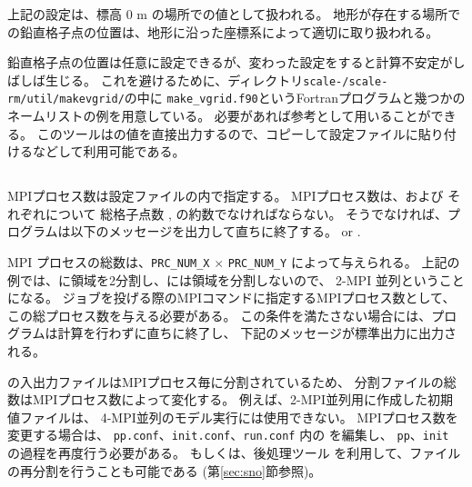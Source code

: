 上記の設定は、標高 0 m の場所での値として扱われる。
地形が存在する場所での鉛直格子点の位置は、地形に沿った座標系によって適切に取り扱われる。


鉛直格子点の位置は任意に設定できるが、変わった設定をすると計算不安定がしばしば生じる。
これを避けるために、ディレクトリ\texttt{scale-\version/scale-rm/util/makevgrid/}の中に
\verb|make_vgrid.f90|というFortranプログラムと幾つかのネームリストの例を用意している。
必要があれば参考として用いることができる。
このツールはの値を直接出力するので、コピーして設定ファイルに貼り付けるなどして利用可能である。

\subsection{\SubsecMPIProcess} \label{subsec:relation_dom_reso2}

MPIプロセス数は設定ファイルの内で指定する。
MPIプロセス数は、\XDIR および \YDIR それぞれについて
総格子点数 ,  の約数でなければならない。
そうでなければ、プログラムは以下のメッセージを出力して直ちに終了する。
or
.

MPI プロセスの総数は、\verb|PRC_NUM_X| $\times$ \verb|PRC_NUM_Y|  によって与えられる。
上記の例では、\XDIR に領域を2分割し、\YDIR には領域を分割しないので、
2-MPI 並列ということになる。
ジョブを投げる際のMPIコマンドに指定するMPIプロセス数として、この総プロセス数を与える必要がある。
この条件を満たさない場合には、プログラムは計算を行わずに直ちに終了し、
下記のメッセージが標準出力に出力される。

\scalerm の入出力ファイルはMPIプロセス毎に分割されているため、
分割ファイルの総数はMPIプロセス数によって変化する。
例えば、2-MPI並列用に作成した初期値ファイルは、
4-MPI並列のモデル実行には使用できない。
MPIプロセス数を変更する場合は、
\verb|pp.conf|、\verb|init.conf|、\verb|run.conf| 内の
を編集し、
\verb|pp|、\verb|init| の過程を再度行う必要がある。
もしくは、後処理ツール \sno を利用して、ファイルの再分割を行うことも可能である
(第\ref{sec:sno}節参照)。

